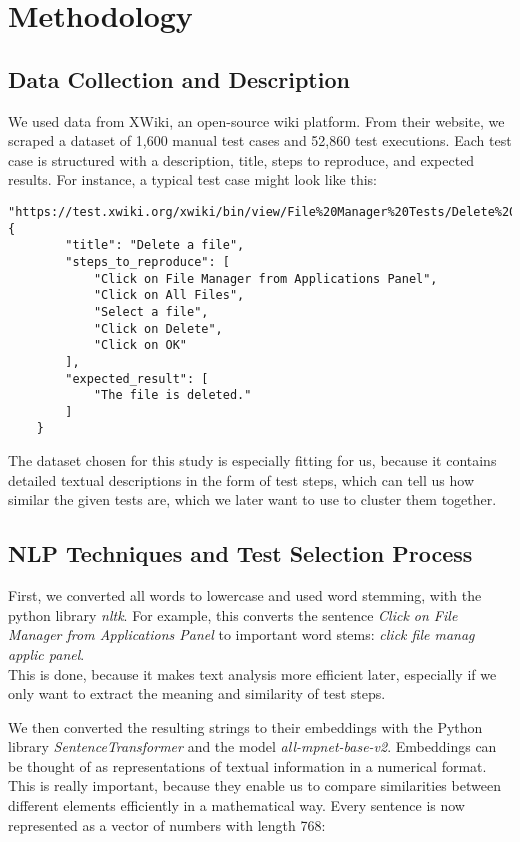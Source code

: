\section{Methodology}
\subsection{Data Collection and Description}
We used data from XWiki, an open-source wiki platform. From their website, we scraped a dataset of 1,600 manual test cases and 52,860 test executions. Each test case is structured with a description, title, steps to reproduce, and expected results. For instance, a typical test case might look like this:

\begin{Verbatim}[fontsize=\small]
    "https://test.xwiki.org/xwiki/bin/view/File%20Manager%20Tests/Delete%20a%20file": {
        "title": "Delete a file",
        "steps_to_reproduce": [
            "Click on File Manager from Applications Panel",
            "Click on All Files",
            "Select a file",
            "Click on Delete",
            "Click on OK"
        ],
        "expected_result": [
            "The file is deleted."
        ]
    }
\end{Verbatim}

The dataset chosen for this study is especially fitting for us, because it contains detailed textual descriptions in the form of test steps, which can tell us how similar the given tests are, which we later want to use to cluster them together.

\subsection{\ac{NLP} Techniques and Test Selection Process}


First, we converted all words to lowercase and used word stemming, with the python library \emph{nltk}.
For example, this converts the sentence \emph{Click on File Manager from Applications Panel} to important word stems: \emph{click file manag applic panel}. \\
This is done, because it makes text analysis more efficient later, especially if we only want to extract the meaning and similarity of test steps.

We then converted the resulting strings to their embeddings with the Python library \emph{SentenceTransformer} and the model \emph{all-mpnet-base-v2}. Embeddings can be thought of as representations of textual information in a numerical format. This is really important, because they enable us to compare similarities between different elements efficiently in a mathematical way. 
Every sentence is now represented as a vector of numbers with length 768:

